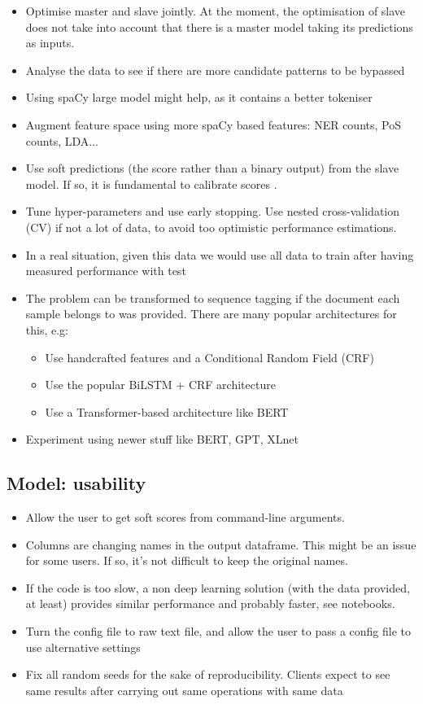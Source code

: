\documentclass[11pt, oneside]{article}   	%
\begin{document}
\begin{itemize}
\item Optimise master and slave jointly. At the moment, the optimisation of slave does not take into account that there is a master model taking its predictions as inputs.
\item Analyse the data to see if there are more candidate patterns to be bypassed
\item Using spaCy large model might help, as it contains a better tokeniser
\item Augment feature space using more spaCy based features: NER counts, PoS counts, LDA...
\item Use soft predictions (the score rather than a binary output) from the slave model. If so, it is fundamental to calibrate scores \cite{calibration}.
\item Tune hyper-parameters and use early stopping. Use nested cross-validation (CV) if not a lot of data, to avoid too optimistic performance estimations.
\item In a real situation, given this data we would use all data to train after having measured performance with test
\item The problem can be transformed to sequence tagging if the document each sample belongs to was provided. There are many popular architectures for this, e.g:
\begin{itemize}
     \item Use handcrafted features and a Conditional Random Field (CRF)\cite{CRF}
     \item Use the popular BiLSTM + CRF architecture \cite{BiLSTM_CRF}
     \item Use a Transformer\cite{Transformer}-based architecture like BERT \cite{BERT}
   \end{itemize}
\item Experiment using newer stuff like BERT, GPT, XLnet
\end{itemize}

\subsection{Model: usability}

\begin{itemize}
\item Allow the user to get soft scores from command-line arguments.
\item Columns are changing names in the output dataframe. This might be an issue for some users. If so, it's not difficult to keep the original names.
\item If the code is too slow, a non deep learning solution (with the data provided, at least) provides similar performance and probably faster, see notebooks.
\item Turn the config file to raw text file, and allow the user to pass a config file to use alternative settings
\item Fix all random seeds for the sake of reproducibility. Clients expect to see same results after carrying out same operations with same data
\end{itemize}
\end{document}
